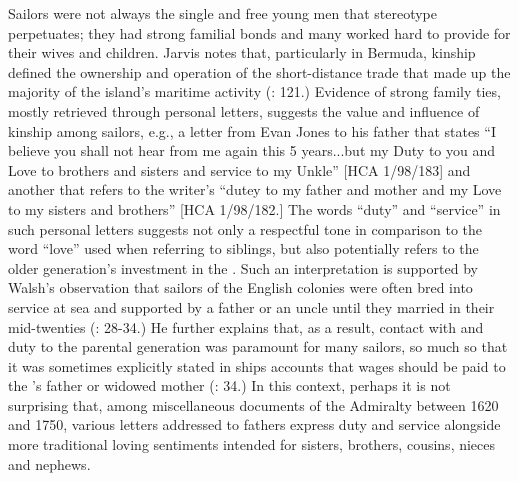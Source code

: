   Sailors were not always the single and free young men that stereotype perpetuates; they had strong familial bonds and many worked hard to provide for their wives and children. Jarvis notes that, particularly in Bermuda, kinship defined the ownership and operation of the short-distance trade that made up the majority of the island’s maritime activity (\citeyear*{Jarvis2010}: 121.) Evidence of strong family ties, mostly retrieved through personal letters, suggests the value and influence of kinship among sailors, e.g., a letter from Evan Jones to his father that states “I believe you shall not hear from me again this 5 years...but my Duty to you and Love to brothers and sisters and service to my Unkle” [HCA 1/98/183] and another that refers to the writer’s “dutey to my father and mother and my Love to my sisters and brothers” [HCA 1/98/182.] The words “duty” and “service” in such personal letters suggests not only a respectful tone in comparison to the word “love” used when referring to siblings, but also potentially refers to the older generation’s investment in the . Such an interpretation is supported by Walsh’s observation that sailors of the English colonies were often bred into service at sea and supported by a father or an uncle until they married in their mid-twenties (\citeyear*{Walsh1994}: 28-34.) He further explains that, as a result, contact with and duty to the parental generation was paramount for many sailors, so much so that it was sometimes explicitly stated in ships accounts that wages should be paid to the ’s father or widowed mother (\citealt{Walsh1994}: 34.) In this context, perhaps it is not surprising that, among miscellaneous documents of the Admiralty between 1620 and 1750, various letters addressed to fathers express duty and service alongside more traditional loving sentiments intended for sisters, brothers, cousins, nieces and nephews.  

